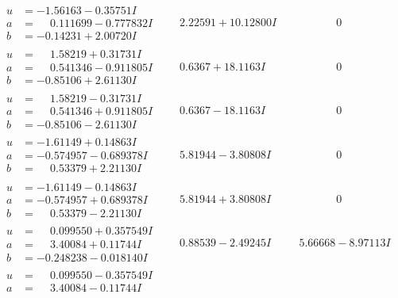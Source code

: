 \documentclass[1p]{elsarticle_modified}
\theoremstyle{definition}
\begin{document}
$$\begin{array}{c|c|c}
 \hline 
\begin{aligned}
u &= -1.56163 - 0.35751 I \\
a &= \phantom{-}0.111699 - 0.777832 I \\
b &= -0.14231 + 2.00720 I\end{aligned}
 & \phantom{-}2.22591 + 10.12800 I & \phantom{-0.000000 } 0 \\ \hline\begin{aligned}
u &= \phantom{-}1.58219 + 0.31731 I \\
a &= \phantom{-}0.541346 - 0.911805 I \\
b &= -0.85106 + 2.61130 I\end{aligned}
 & \phantom{-}0.6367 + 18.1163 I & \phantom{-0.000000 } 0 \\ \hline\begin{aligned}
u &= \phantom{-}1.58219 - 0.31731 I \\
a &= \phantom{-}0.541346 + 0.911805 I \\
b &= -0.85106 - 2.61130 I\end{aligned}
 & \phantom{-}0.6367 - 18.1163 I & \phantom{-0.000000 } 0 \\ \hline\begin{aligned}
u &= -1.61149 + 0.14863 I \\
a &= -0.574957 - 0.689378 I \\
b &= \phantom{-}0.53379 + 2.21130 I\end{aligned}
 & \phantom{-}5.81944 - 3.80808 I & \phantom{-0.000000 } 0 \\ \hline\begin{aligned}
u &= -1.61149 - 0.14863 I \\
a &= -0.574957 + 0.689378 I \\
b &= \phantom{-}0.53379 - 2.21130 I\end{aligned}
 & \phantom{-}5.81944 + 3.80808 I & \phantom{-0.000000 } 0 \\ \hline\begin{aligned}
u &= \phantom{-}0.099550 + 0.357549 I \\
a &= \phantom{-}3.40084 + 0.11744 I \\
b &= -0.248238 - 0.018140 I\end{aligned}
 & \phantom{-}0.88539 - 2.49245 I & \phantom{-}5.66668 - 8.97113 I \\ \hline\begin{aligned}
u &= \phantom{-}0.099550 - 0.357549 I \\
a &= \phantom{-}3.40084 - 0.11744 I \\

\end{aligned}
\end{array}$$
\end{document}
